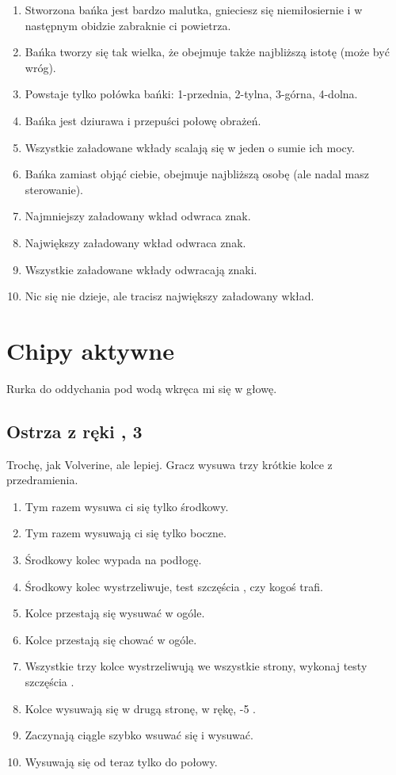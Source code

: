\begin{enumerate}
	\item Stworzona bańka jest bardzo malutka, gnieciesz się niemiłosiernie i w następnym obidzie zabraknie ci powietrza.
	\item Bańka tworzy się tak wielka, że obejmuje także najbliższą istotę (może być wróg).
	\item Powstaje tylko \diiii{} połówka bańki: 1-przednia, 2-tylna, 3-górna, 4-dolna.
	\item Bańka jest dziurawa i przepuści połowę obrażeń.
	\item Wszystkie załadowane wkłady scalają się w jeden o sumie ich mocy.
	\item Bańka zamiast objąć ciebie, obejmuje najbliższą osobę (ale nadal masz sterowanie).
	\item Najmniejszy załadowany wkład odwraca znak.
	\item Największy załadowany wkład odwraca znak.
	\item Wszystkie załadowane wkłady odwracają znaki.
	\item Nic się nie dzieje, ale tracisz największy załadowany wkład.
\end{enumerate}

\section{Chipy aktywne}
Rurka do oddychania pod wodą wkręca mi się w głowę.

\subsection{Ostrza z ręki \abh{}, 3 \abnkp{}}
Trochę, jak Volverine, ale lepiej.
Gracz wysuwa trzy krótkie kolce z przedramienia.
\begin{enumerate}
	\item Tym razem wysuwa ci się tylko środkowy.
	\item Tym razem wysuwają ci się tylko boczne.
	\item Środkowy kolec wypada na podłogę.
	\item Środkowy kolec wystrzeliwuje, test szczęścia \aba{}, czy kogoś trafi.
	\item Kolce przestają się wysuwać w ogóle.
	\item Kolce przestają się chować w ogóle.
	\item Wszystkie trzy kolce wystrzeliwują we wszystkie strony, wykonaj testy szczęścia \aba{}.
	\item Kolce wysuwają się w drugą stronę, w rękę, -5 \abzyc{}.
	\item Zaczynają ciągle szybko wsuwać się i wysuwać.
	\item Wysuwają się od teraz tylko do połowy.
\end{enumerate}








